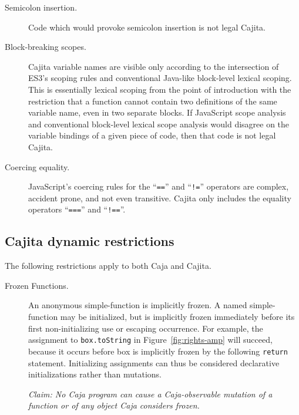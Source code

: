 \documentclass[letterpaper,twocolumn,10pt]{article}
\newcommand{\code}[1]{{\tt {#1}}}              %
\begin{document}
\begin{description}
    \item[Semicolon insertion.] Code which would provoke semicolon insertion is not legal Cajita.
    
    \item[Block-breaking scopes.] Cajita variable names are visible only according to the intersection of ES3's 
    scoping rules and conventional Java-like block-level lexical scoping. This is essentially lexical scoping from 
    the point of introduction with the restriction that a function cannot contain two definitions of the same 
    variable name, even in two separate blocks. If JavaScript scope analysis and conventional block-level lexical 
    scope analysis would disagree on the variable bindings of a given piece of code, then that code is not legal 
    Cajita.
    
    \item[Coercing equality.] JavaScript's coercing rules for the ``\code{==}'' and ``\code{!=}'' operators are 
    complex, accident prone, and not even transitive. Cajita only includes the equality operators ``\code{===}'' and 
    ``\code{!==}''.
        
\end{description}


\subsection{Cajita dynamic restrictions}
\label{subsec:cajita:dynamic}

The following restrictions apply to both Caja and Cajita.

\begin{description}

  \item[Frozen Functions.] An anonymous simple-function is implicitly frozen. 
  A named simple-function may be initialized, but is implicitly frozen 
  immediately before its first non-initializing use or escaping occurrence. 
  For example, the assignment to \code{box.toString} in 
  Figure~\ref{fig:rights-amp} will succeed, because it occurs before box is 
  implicitly frozen by the following \code{return} statement. Initializing 
  assignments can thus be considered declarative initializations rather than 
  mutations.
  
  \emph{Claim: No Caja program can cause a Caja-observable mutation of a 
  function or of any object Caja considers frozen.}
  
\end{description}
\end{document}
